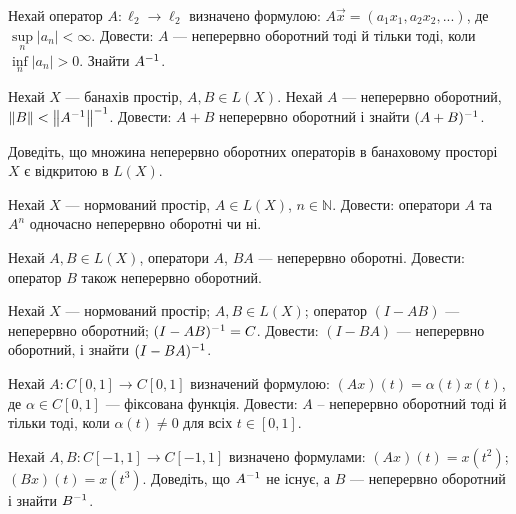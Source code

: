 \begin{exercise}
    Нехай оператор $A: \ell_2 \rightarrow \ell_2$ визначено формулою: 
    $A\vec{x} = (a_1x_1, a_2x_2, ...)$, де $\underset{n}{\sup}|a_n| < \infty$. Довести: 
    $A$ --- неперервно оборотний тоді й тільки тоді, коли $\underset{n}{\inf}|a_n| > 0$. 
    Знайти $A^{-1}$.
\end{exercise}

\begin{exercise}\label{N:1_6_6}
    Нехай $X$ --- банахів простір, $A, B \in L(X)$. Нехай $A$ --- неперервно оборотний, 
    $\left\lVert B\right\rVert < \left\lVert A^{-1}\right\rVert^{-1}$. Довести: $A + B$ неперервно оборотний і знайти 
    $(A+B)^{-1}$.
\end{exercise}

\begin{exercise}
    Доведіть, що множина неперервно оборотних операторів в банаховому просторі $X$ є відкритою 
    в $L(X)$. 
\end{exercise}

\begin{exercise}
    Нехай $X$ --- нормований простір, $A \in L(X)$, $n \in \mathbb{N}$. Довести: оператори 
    $A$ та $A^n$ одночасно неперервно оборотні чи ні.
\end{exercise}

\begin{exercise}
    Нехай $A, B \in L(X)$, оператори $A$, $BA$ --- неперервно оборотні. Довести: оператор 
    $B$ також неперервно оборотний.
\end{exercise}

\begin{exercise}
    Нехай $X$ --- нормований простір; $A, B \in L(X)$; оператор $(I - AB)$ --- неперервно 
    оборотний; $(I - AB)^{-1} = C$. Довести: $(I - BA)$ --- неперервно оборотний, і знайти 
    $(I - BA)^{-1}$.
\end{exercise}

\begin{exercise}
    Нехай $A: C[0, 1] \rightarrow C[0, 1]$ визначений формулою: $(Ax)(t) = \alpha(t)x(t)$, 
    де $\alpha \in C[0, 1]$ --- фіксована функція. Довести: $A$ -- неперервно оборотний 
    тоді й тільки тоді, коли $\alpha(t) \neq 0$ для всіх $t \in [0, 1]$. 
\end{exercise}

\begin{exercise}
    Нехай $A, B : C[-1, 1] \rightarrow C[-1, 1]$ визначено формулами: $(Ax)(t) = 
    x(t^2)$; $(Bx)(t) = x(t^3)$. Доведіть, що $A^{-1}$ не існує, а $B$ --- неперервно 
    оборотний і знайти $B^{-1}$.
\end{exercise}